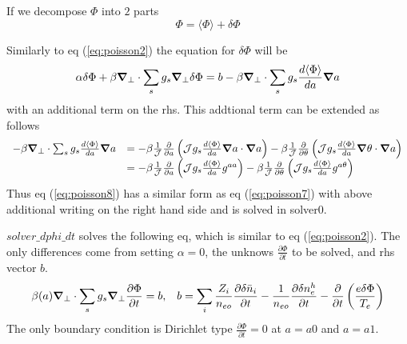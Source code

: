 \documentclass{report}
\newcommand{\bm}[1]{\mbox{\boldmath $#1$}}
\newcommand{\ff}[2]{\frac{#1}{#2}}
\newcommand{\pp}[2]{\frac{\partial{#1}}{\partial{#2}}}
\begin{document}
If we decompose $\Phi$ into $2$ parts
$$
\Phi = \langle \Phi \rangle + \delta \Phi
$$

Similarly to eq (\ref{eq:poisson2}) the equation for $\delta \Phi$ will be
\begin{equation}
\label{eq:poisson8}
\alpha \delta \Phi 
+ \beta 
\bm{\nabla}_\perp \cdot \sum_s g_s \bm{\nabla}_\perp \delta \Phi 
=
b - \beta \bm{\nabla}_\perp \cdot \sum_s g_s \ff{d\langle \Phi \rangle}{da} \bm{\nabla}a
\end{equation}
with an additional term on the rhs.
 This addtional term can be extended as follows
$$
\begin{array}{ll}
- \beta \bm{\nabla}_\perp \cdot \sum_s g_s \ff{d\langle \Phi \rangle}{da} \bm{\nabla}a
& =
- \beta \ff{1}{\cal J} \pp{}{a} \left(
           {\cal J} g_s \ff{d\langle \Phi \rangle}{da} \bm{\nabla}a \cdot \bm{\nabla}a
                                \right)
- \beta \ff{1}{\cal J} \pp{}{\theta} \left(
           {\cal J} g_s \ff{d\langle \Phi \rangle}{da} \bm{\nabla} \theta \cdot \bm{\nabla}a
                                     \right)
\\
& =
- \beta \ff{1}{\cal J} \pp{}{a} \left(
           {\cal J} g_s \ff{d\langle \Phi \rangle}{da} g^{aa}
                                \right)
- \beta \ff{1}{\cal J} \pp{}{\theta} \left(
           {\cal J} g_s \ff{d\langle \Phi \rangle}{da} g^{a\theta}
                                     \right)
\end{array}
$$
Thus eq (\ref{eq:poisson8}) has a similar form as 
eq (\ref{eq:poisson7}) with above additional writing on the right hand side
and is solved in solver0.

$solver\_dphi\_dt$ solves the following eq, which is similar to eq (\ref{eq:poisson2}).
The only differences come from setting $\alpha=0$, the unknows $\pp{\Phi}{t}$ to be solved,
and rhs vector $b$.
\begin{equation}
\label{eq:poisson9}
\beta (a) \bm{\nabla}_\perp \cdot \sum_s g_s \bm{\nabla}_\perp \pp{\Phi}{t} = b,
\;\;\;
b=\sum_i \ff{Z_i}{n_{eo}} \pp{\delta \bar{n}_i}{t} 
  - \ff{1}{n_{eo}} \pp{\delta n_e^h}{t} 
  - \pp{}{t}\left( \ff{e\delta \Phi}{T_e} \right)
\end{equation}
The only boundary condition is Dirichlet type $\pp{\Phi}{t}=0$ at $a=a0$ and $a=a1$.
\end{document}
